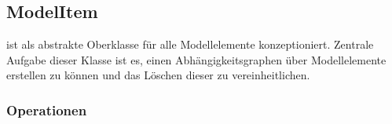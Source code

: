 \subsection{ModelItem}

 ist als abstrakte Oberklasse für alle Modellelemente konzeptioniert. 
Zentrale Aufgabe dieser Klasse ist es, einen Abhängigkeitsgraphen über Modellelemente erstellen zu können und 
das Löschen dieser zu vereinheitlichen. 

\subsubsection{Operationen}



